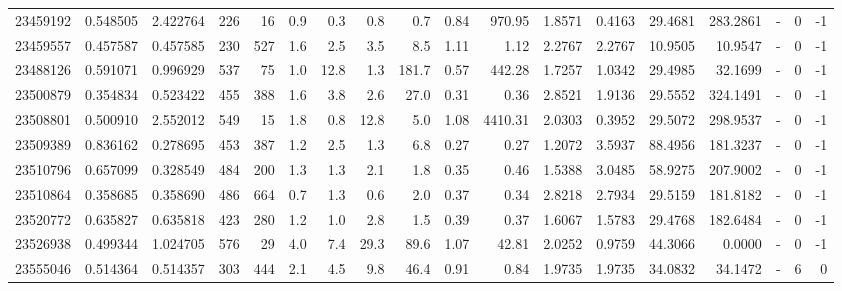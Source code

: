 \begin{tabular}{rrrrrrrrrrrrrrrlrr}
  23459192 & 0.548505 &   2.422764 &  226 &   16 &      0.9 &      0.3 &     0.8 &      0.7 &       0.84 &      970.95 &  1.8571 &  0.4163 &   29.4681 &  283.2861 &             - &        0 &         -1 \\
  23459557 & 0.457587 &   0.457585 &  230 &  527 &      1.6 &      2.5 &     3.5 &      8.5 &       1.11 &        1.12 &  2.2767 &  2.2767 &   10.9505 &   10.9547 &             - &        0 &         -1 \\
  23488126 & 0.591071 &   0.996929 &  537 &   75 &      1.0 &     12.8 &     1.3 &    181.7 &       0.57 &      442.28 &  1.7257 &  1.0342 &   29.4985 &   32.1699 &             - &        0 &         -1 \\
  23500879 & 0.354834 &   0.523422 &  455 &  388 &      1.6 &      3.8 &     2.6 &     27.0 &       0.31 &        0.36 &  2.8521 &  1.9136 &   29.5552 &  324.1491 &             - &        0 &         -1 \\
  23508801 & 0.500910 &   2.552012 &  549 &   15 &      1.8 &      0.8 &    12.8 &      5.0 &       1.08 &     4410.31 &  2.0303 &  0.3952 &   29.5072 &  298.9537 &             - &        0 &         -1 \\
  23509389 & 0.836162 &   0.278695 &  453 &  387 &      1.2 &      2.5 &     1.3 &      6.8 &       0.27 &        0.27 &  1.2072 &  3.5937 &   88.4956 &  181.3237 &             - &        0 &         -1 \\
  23510796 & 0.657099 &   0.328549 &  484 &  200 &      1.3 &      1.3 &     2.1 &      1.8 &       0.35 &        0.46 &  1.5388 &  3.0485 &   58.9275 &  207.9002 &             - &        0 &         -1 \\
  23510864 & 0.358685 &   0.358690 &  486 &  664 &      0.7 &      1.3 &     0.6 &      2.0 &       0.37 &        0.34 &  2.8218 &  2.7934 &   29.5159 &  181.8182 &             - &        0 &         -1 \\
  23520772 & 0.635827 &   0.635818 &  423 &  280 &      1.2 &      1.0 &     2.8 &      1.5 &       0.39 &        0.37 &  1.6067 &  1.5783 &   29.4768 &  182.6484 &             - &        0 &         -1 \\
  23526938 & 0.499344 &   1.024705 &  576 &   29 &      4.0 &      7.4 &    29.3 &     89.6 &       1.07 &       42.81 &  2.0252 &  0.9759 &   44.3066 &    0.0000 &             - &        0 &         -1 \\
  23555046 & 0.514364 &   0.514357 &  303 &  444 &      2.1 &      4.5 &     9.8 &     46.4 &       0.91 &        0.84 &  1.9735 &  1.9735 &   34.0832 &   34.1472 &             - &        6 &          0 \\

\end{tabular}
